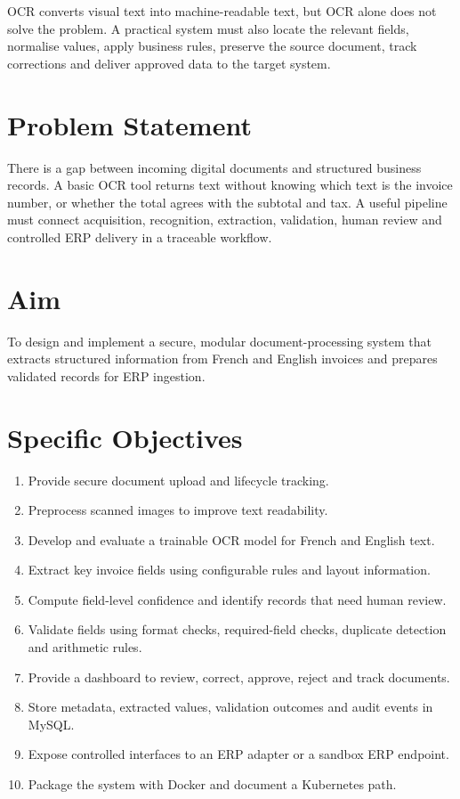 \documentclass[11pt,a4paper]{report}
\begin{document}
OCR converts visual text into machine-readable text, but OCR alone does not solve the problem. A practical system must also locate the relevant fields, normalise values, apply business rules, preserve the source document, track corrections and deliver approved data to the target system.

\section{Problem Statement}
There is a gap between incoming digital documents and structured business records. A basic OCR tool returns text without knowing which text is the invoice number, or whether the total agrees with the subtotal and tax. A useful pipeline must connect acquisition, recognition, extraction, validation, human review and controlled ERP delivery in a traceable workflow.

\section{Aim}
To design and implement a secure, modular document-processing system that extracts structured information from French and English invoices and prepares validated records for ERP ingestion.

\section{Specific Objectives}
\begin{enumerate}
\item Provide secure document upload and lifecycle tracking.
\item Preprocess scanned images to improve text readability.
\item Develop and evaluate a trainable OCR model for French and English text.
\item Extract key invoice fields using configurable rules and layout information.
\item Compute field-level confidence and identify records that need human review.
\item Validate fields using format checks, required-field checks, duplicate detection and arithmetic rules.
\item Provide a dashboard to review, correct, approve, reject and track documents.
\item Store metadata, extracted values, validation outcomes and audit events in MySQL.
\item Expose controlled interfaces to an ERP adapter or a sandbox ERP endpoint.
\item Package the system with Docker and document a Kubernetes path.
\end{enumerate}
\end{document}
